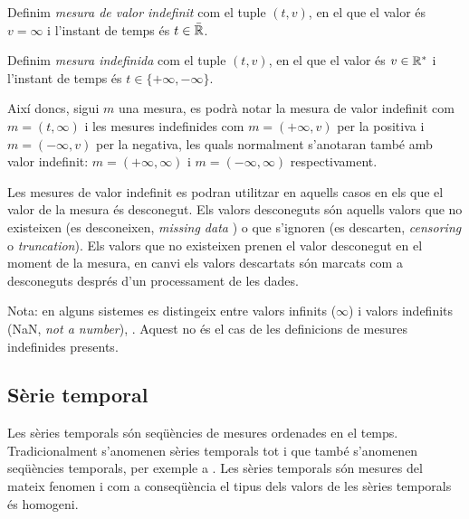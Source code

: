 \begin{definition}
  \label{def:model:mesura_valor_indefinit}
  Definim \emph{mesura de valor indefinit} com el tuple $(t,v)$, en el
  que el valor és $v=\infty$ i l'instant de temps és
  $t\in\bar{\mathbb{R}{}}$.
\end{definition}

\begin{definition}
  \label{def:model:mesura_indefinida}
  Definim \emph{mesura indefinida} com el tuple $(t,v)$, en el que el
  valor és $v\in\mathbb{R}{}^*$ i l'instant de temps és
  $t\in\{+\infty,-\infty\}$.
\end{definition}

Així doncs, sigui $m$ una mesura, es podrà notar la mesura de valor
indefinit com $m=(t,\infty)$ i les mesures indefinides com
$m=(+\infty,v)$ per la positiva i $m=(-\infty,v)$ per la negativa, les
quals normalment s'anotaran també amb valor indefinit:
$m=(+\infty,\infty)$ i $m=(-\infty,\infty)$ respectivament.


Les mesures de valor indefinit es podran utilitzar en aquells casos en
els que el valor de la mesura és desconegut. Els valors desconeguts
són aquells valors que no existeixen (es desconeixen, \emph{missing
  data} ) o que s'ignoren (es descarten, \emph{censoring} o
\emph{truncation}). Els valors que no existeixen prenen el valor
desconegut en el moment de la mesura, en canvi els valors descartats
són marcats com a desconeguts després d'un processament de les dades.

Nota: en alguns sistemes es distingeix entre valors infinits
($\infty$) i valors indefinits (NaN, \emph{not a number}),
\cite{wiki:ieee754}. Aquest no és el cas de les definicions de mesures
indefinides presents.







\subsection{Sèrie temporal}
\label{sec:model:serietemporal}

Les sèries temporals són seqüències de mesures ordenades en el temps.
Tradicionalment s'anomenen sèries temporals tot i que també s'anomenen
seqüències temporals, per exemple a \cite{last:hetland}.  Les sèries
temporals són mesures del mateix fenomen i com a conseqüència el tipus
dels valors de les sèries temporals és homogeni.



